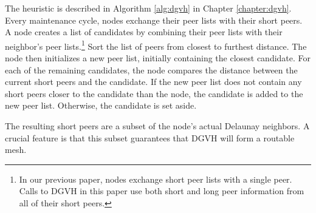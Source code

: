 The heuristic is described in Algorithm \ref{alg:dgvh} in Chapter \ref{chapter:dgvh}.
Every maintenance cycle, nodes exchange their peer lists with their short peers.
A node creates a list of candidates by combining their peer lists with their neighbor's peer lists.\footnote{In our previous paper, nodes exchange short peer lists with a single peer. Calls to DGVH in this paper use both short and long peer information from all of their short peers.}
Sort the list of peers from closest to furthest distance.
The node then initializes a new peer list, initially containing the closest candidate.
For each of the remaining candidates, the node compares the distance between the current short peers and the candidate.
If the new peer list does not contain any short  peers closer to the candidate than the node, the candidate is added to the new peer list.
Otherwise, the candidate is set aside.

The resulting short peers are a subset of the node's actual Delaunay neighbors.
A crucial feature is that this subset guarantees that DGVH will form a routable mesh.




